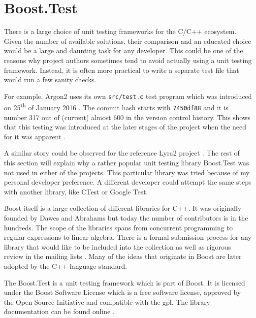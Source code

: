 \section{Boost.Test}
\label{sec:unit-boost-google}

There is a large choice of unit testing frameworks for the C/C++ ecosystem. Given the number of available solutions, their comparison and an educated choice would be a large and daunting task for any developer. This could be one of the reasons why project authors sometimes tend to avoid actually using a unit testing framework. Instead, it is often more practical to write a separate test file that would run a few sanity checks.

For example, Argon2 uses its own \texttt{src/test.c} test program which was introduced on 25\textsuperscript{th} of January 2016 \cite{github:2017:argon2}. The commit hash starts with \texttt{7450df88} and it is number 317 out of (current) almost 600 in the version control history. This shows that this testing was introduced at the later stages of the project when the need for it was apparent \cite{github:2017:argon2-issue-85}.

A similar story could be observed for the reference Lyra2 project \cite{github:2017:lyra}. The rest of this section will explain why a rather popular unit testing library Boost.Test was not used in either of the projects. This particular library was tried because of my personal developer preference. A different developer could attempt the same steps with another library, like CTest or Google Test.

Boost itself is a large collection of different libraries for C++. It was originally founded by Dawes and Abrahams but today the number of contributors is in the hundreds. The scope of the libraries spans from concurrent programming to regular expressions to linear algebra. There is a formal submission process for any library that would like to be included into the collection \cite{boost:2017:submission-process} as well as rigorous review in the mailing lists \cite{boost:2017:mailing-list}. Many of the ideas that originate in Boost are later adopted by the C++ language standard.

The Boost.Test is a unit testing framework which is part of Boost. It is licensed under the Boost Software License which is a free software license, approved by the Open Source Initiative and compatible with the \gls{gpl}. The library documentation can be found online \cite{boost:2017:test-docs}.


